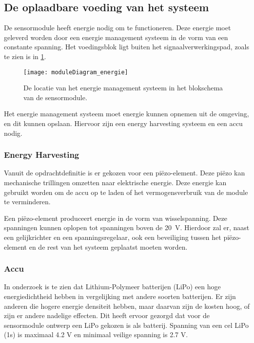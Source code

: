 

\subsection{De oplaadbare voeding van het systeem} \label{sec:energy}
De sensormodule heeft energie nodig om te functioneren. Deze energie moet geleverd worden door een energie management systeem in de vorm van een constante spanning. Het voedingsblok ligt buiten het signaalverwerkingspad, zoals te zien is in \cref{fig:moduleDiagram_energie}.

\begin{figure}[!htbp]
    \centering
    \texttt{[image: moduleDiagram\_energie]}
    \caption{De locatie van het energie management systeem in het blokschema van de sensormodule.}
    \label{fig:moduleDiagram_energie}
\end{figure}

Het energie management systeem moet energie kunnen opnemen uit de omgeving, en dit kunnen opslaan. Hiervoor zijn een energy harvesting systeem en een accu nodig.

\subsubsection{Energy Harvesting} \label{sec:harvesting}

Vanuit de opdrachtdefinitie is er gekozen voor een piëzo-element. Deze piëzo kan mechanische trillingen omzetten naar elektrische energie. Deze energie kan gebruikt worden om de accu op te laden of het vermogensverbruik van de module te verminderen.

Een piëzo-element produceert energie in de vorm van wisselspanning. Deze spanningen kunnen oplopen tot spanningen boven de \qty{20}{\volt}.%
Hierdoor zal er, naast een gelijkrichter en een spanningsregelaar, ook een beveiliging tussen het piëzo-element en de rest van het systeem geplaatst moeten worden.


\subsubsection{Accu} \label{sec:batterijOntwerp}
In onderzoek \cite{BatteryComparison} is te zien dat Lithium-Polymeer batterijen (LiPo) een hoge energiedichtheid hebben in vergelijking met andere soorten batterijen. Er zijn anderen die hogere energie densiteit hebben, maar daarvan zijn de kosten hoog, of zijn er andere nadelige effecten\cite{BatteryComparison}. Dit heeft ervoor gezorgd dat voor de sensormodule ontwerp een LiPo gekozen is als batterij. Spanning van een cel LiPo (1s) is maximaal 4.2 V en minimaal veilige spanning is 2.7 V\cite{BatteryComparison}.


